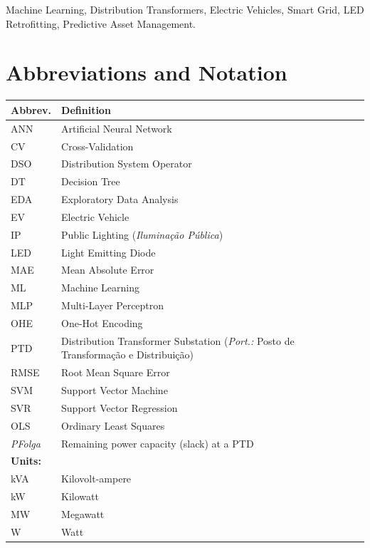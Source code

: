 \documentclass[conference]{IEEEtran}
\begin{document}
\begin{IEEEkeywords}
Machine Learning, Distribution Transformers, Electric Vehicles, Smart Grid, LED Retrofitting, Predictive Asset Management.
\end{IEEEkeywords}

\section*{Abbreviations and Notation}
\label{sec:abbrev}

\begin{table}[htbp]
\centering
\small
\begin{tabular}{p{}p{}}
\toprule
\textbf{Abbrev.} & \textbf{Definition} \\
\midrule
ANN  & Artificial Neural Network \\
CV   & Cross-Validation \\
DSO  & Distribution System Operator \\
DT   & Decision Tree \\
EDA  & Exploratory Data Analysis \\
EV   & Electric Vehicle \\
IP   & Public Lighting (\textit{Iluminação Pública}) \\
LED  & Light Emitting Diode \\
MAE  & Mean Absolute Error \\
ML   & Machine Learning \\
MLP  & Multi-Layer Perceptron \\
OHE  & One-Hot Encoding \\
PTD  & Distribution Transformer Substation (\textit{Port.:} Posto de Transforma\c{c}\~{a}o e Distribui\c{c}\~{a}o) \\
RMSE & Root Mean Square Error \\
SVM  & Support Vector Machine \\
SVR  & Support Vector Regression \\
OLS  & Ordinary Least Squares \\
\textit{PFolga} & Remaining power capacity (slack) at a PTD \\
\midrule
\textbf{Units:} & \\
kVA & Kilovolt-ampere \\
kW  & Kilowatt \\
MW  & Megawatt \\
W   & Watt \\
\bottomrule
\end{tabular}
\end{table}
\end{document}
